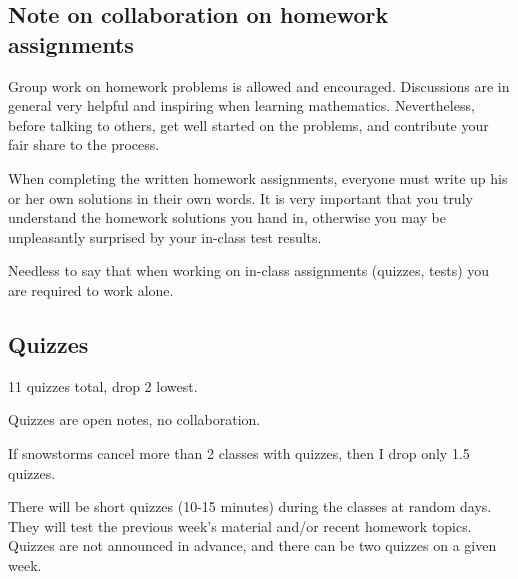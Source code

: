 \documentclass[oneside,11pt]{amsart}
\begin{document}

%

\subsection*{Note on collaboration on homework assignments}
\label{collaboration}

Group work on homework problems is allowed and encouraged.
Discussions are in general very
helpful and inspiring when learning mathematics.
Nevertheless, before talking to others, get well started
on the problems, and contribute your fair share to the process.

When completing the written homework assignments, everyone must write up his or her own
solutions in their own words.
It is very important that you truly understand the homework solutions you hand
in, otherwise you may be unpleasantly surprised by your in-class test results.

Needless to say that when working on in-class assignments (quizzes, tests)
you are required to work alone.

\subsection{Quizzes}

11 quizzes total, drop 2 lowest. 

Quizzes are open notes, no collaboration.

If snowstorms cancel more than 2 classes with quizzes, then I drop only 1.5 quizzes.


There will be short quizzes (10-15 minutes)
during the classes at random days. 
They will test the previous week's material and/or recent homework
topics. 
Quizzes are not announced in advance, and there can be two quizzes
on a given week. 
\end{document}
